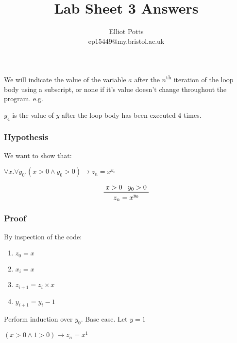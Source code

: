 \documentclass{article}
\title{Lab Sheet 3 Answers}
\author{Elliot Potts \\ ep15449@my.bristol.ac.uk}
\begin{document}
\maketitle
We will indicate the value of the variable $a$ after the $n$\textsuperscript{th} iteration of the loop body using a subscript, or none if it's value doesn't change throughout the program. e.g.

$y_4$ is the value of $y$ after the loop body has been executed 4 times.

\subsubsection{Hypothesis}
We want to show that:

$\forall x. \forall y_0. (x > 0 \land y_0 > 0) \rightarrow z_n = x^{y_0}$

\begin{displaymath}
  \prftree
      {x > 0}
      {y_0 > 0}
      {z_n = x^{y_0}}
\end{displaymath}

\subsubsection{Proof}
By inspection of the code:
\begin{enumerate}
  \item{$z_0 = x$}
  \item{$x_i = x$}
  \item{$z_{i+1} = z_i \times x$}
  \item{$y_{i+1} = y_i - 1$}
\end{enumerate}

Perform induction over $y_0$.
Base case. Let $y = 1$

$(x > 0 \land 1 > 0) \rightarrow z_n = x^{1}$
\end{document}
